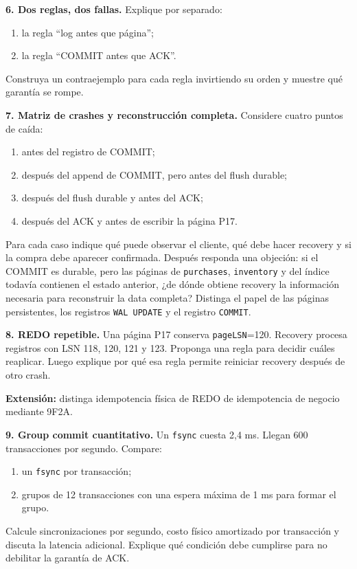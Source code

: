 \documentclass[variant=guia,cover=institutional,mode=screen]{ua-engineering-v6-article}
\begin{document}
\begin{uaexercise}
\textbf{6. Dos reglas, dos fallas.} Explique por separado:

\begin{enumerate}
\item la regla ``log antes que página'';
\item la regla ``COMMIT antes que ACK''.
\end{enumerate}

Construya un contraejemplo para cada regla invirtiendo su orden y muestre qué garantía se rompe.
\end{uaexercise}

\begin{uaexercise}
\textbf{7. Matriz de crashes y reconstrucción completa.} Considere cuatro puntos de caída:

\begin{enumerate}
\item antes del registro de COMMIT;
\item después del append de COMMIT, pero antes del flush durable;
\item después del flush durable y antes del ACK;
\item después del ACK y antes de escribir la página P17.
\end{enumerate}

Para cada caso indique qué puede observar el cliente, qué debe hacer recovery y si la compra debe aparecer confirmada. Después responda una objeción: si el COMMIT es durable, pero las páginas de \texttt{purchases}, \texttt{inventory} y del índice todavía contienen el estado anterior, ¿de dónde obtiene recovery la información necesaria para reconstruir la data completa? Distinga el papel de las páginas persistentes, los registros \texttt{WAL UPDATE} y el registro \texttt{COMMIT}.
\end{uaexercise}

\begin{uaexercise}
\textbf{8. REDO repetible.} Una página P17 conserva \texttt{pageLSN}=120. Recovery procesa registros con LSN 118, 120, 121 y 123. Proponga una regla para decidir cuáles reaplicar. Luego explique por qué esa regla permite reiniciar recovery después de otro crash.

\textbf{Extensión:} distinga idempotencia física de REDO de idempotencia de negocio mediante 9F2A.
\end{uaexercise}

\begin{uaexercise}
\textbf{9. Group commit cuantitativo.} Un \texttt{fsync} cuesta 2,4 ms. Llegan 600 transacciones por segundo. Compare:

\begin{enumerate}
\item un \texttt{fsync} por transacción;
\item grupos de 12 transacciones con una espera máxima de 1 ms para formar el grupo.
\end{enumerate}

Calcule sincronizaciones por segundo, costo físico amortizado por transacción y discuta la latencia adicional. Explique qué condición debe cumplirse para no debilitar la garantía de ACK.
\end{uaexercise}
\end{document}
